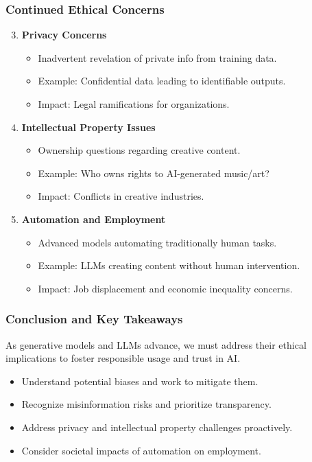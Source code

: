\documentclass[aspectratio=169]{beamer}
\begin{document}
\begin{frame}[fragile]
    \frametitle{Continued Ethical Concerns}
    \begin{enumerate}
        \setcounter{enumi}{2}
        \item \textbf{Privacy Concerns}
            \begin{itemize}
                \item Inadvertent revelation of private info from training data.
                \item Example: Confidential data leading to identifiable outputs.
                \item Impact: Legal ramifications for organizations.
            \end{itemize}
            
        \item \textbf{Intellectual Property Issues}
            \begin{itemize}
                \item Ownership questions regarding creative content.
                \item Example: Who owns rights to AI-generated music/art?
                \item Impact: Conflicts in creative industries.
            \end{itemize}
            
        \item \textbf{Automation and Employment}
            \begin{itemize}
                \item Advanced models automating traditionally human tasks.
                \item Example: LLMs creating content without human intervention.
                \item Impact: Job displacement and economic inequality concerns.
            \end{itemize}
    \end{enumerate}
\end{frame}

\begin{frame}[fragile]
    \frametitle{Conclusion and Key Takeaways}
    As generative models and LLMs advance, we must address their ethical implications to foster responsible usage and trust in AI.

    \begin{itemize}
        \item Understand potential biases and work to mitigate them.
        \item Recognize misinformation risks and prioritize transparency.
        \item Address privacy and intellectual property challenges proactively.
        \item Consider societal impacts of automation on employment.
    \end{itemize}
\end{frame}
\end{document}
